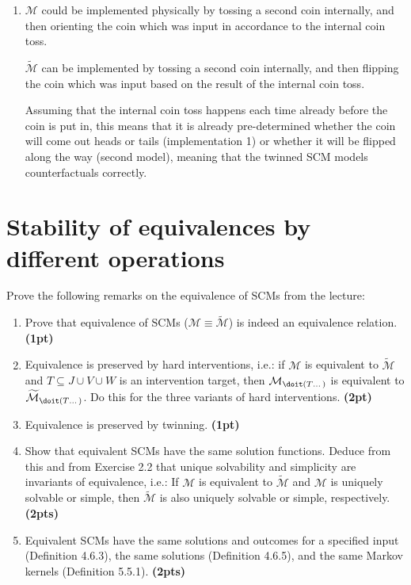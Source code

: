 \begin{gradedsolution}
\begin{enumerate}
	This is the expected outcome: The first model does not care about the input at all, and so if the ``randomness'' $w$ is the same in the actual, and the counterfactual world, then the outcome $y = y'$ is the same.
	However, the second model multiplies the ``randomness'' $w$ with the input $x$ or $x'$, and so if the input changes, the output also must change, and so we cannot have the outcome $y' = y$.

	
      \item $\mathcal{M}$ could be implemented physically by tossing a second coin internally, and then orienting the coin which was input in accordance to the internal coin toss.

	$\widetilde{\mathcal{M}}$ can be implemented by tossing a second coin internally, and then flipping the coin which was input based on the result of the internal coin toss.

	Assuming that the internal coin toss happens each time already before the coin is put in, this means that it is already pre-determined whether the coin will come out heads or tails (implementation 1) or whether it will be flipped along the way (second model), meaning that the twinned SCM models counterfactuals correctly.

      \end{enumerate}
  \end{gradedsolution}


\section{Stability of equivalences by different operations}

Prove the following remarks on the equivalence of SCMs from the lecture:

\begin{enumerate}
  \item Prove that equivalence of SCMs ($\mathcal{M} \equiv \widetilde{\mathcal{M}}$) is indeed an equivalence relation.  \textbf{(1pt)}
  \item Equivalence is preserved by hard interventions, i.e.: if $\mathcal{M}$ is equivalent to $\widetilde{\mathcal{M}}$ and $T \subseteq J \cup V \cup W$ is an intervention target, then $\mathcal{M}_{\doit(T\dots)}$ is equivalent to $\widetilde{\mathcal{M}}_{\doit(T\dots)}$. Do this for the three variants of hard interventions.  \textbf{(2pt)}
  \item Equivalence is preserved by twinning. \textbf{(1pt)}  
  \item Show that equivalent SCMs have the same solution functions. 
    Deduce from this and from Exercise 2.2 that unique solvability and simplicity are invariants of equivalence, i.e.: 
    If $\mathcal{M}$ is equivalent to $\widetilde{\mathcal{M}}$ and $\mathcal{M}$ is uniquely solvable or simple, then $\widetilde{\mathcal{M}}$ is also uniquely solvable or simple, respectively. \textbf{(2pts)} 
  \item Equivalent SCMs have the same solutions and outcomes for a specified input (Definition 4.6.3), the same solutions (Definition 4.6.5), and the same Markov kernels (Definition 5.5.1). \textbf{(2pts)} 
  \end{enumerate}


